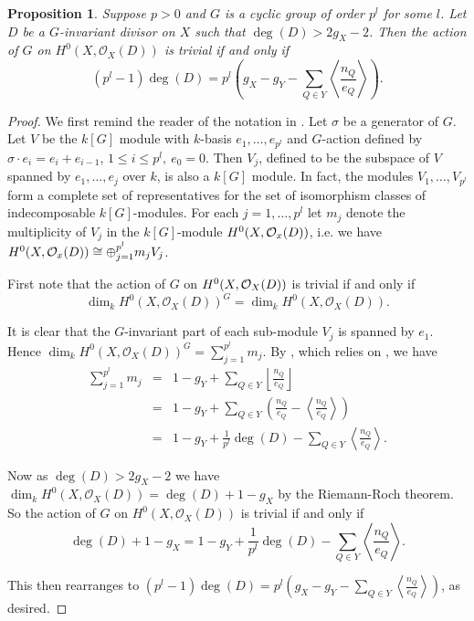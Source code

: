 \documentclass[11pt]{article} %
\newtheorem{prop}{Proposition}
\theoremstyle{remark}\newtheorem*{rem}{Remark}
\newcommand{\cO}{{\cal O}}
\begin{document}
  \begin{prop}\label{nakaj}
    Suppose $p>0$ and $G$ is a cyclic group of order $p^l$ for some $l$.
    Let $D$ be a $G$-invariant divisor on $X$ such that $\deg(D)>2g_X-2$.
    Then the action of $G$ on $H^0(X,\mathscr{O}_X(D))$ is trivial if and only if
      \[ 
	(p^l-1)\deg(D)=p^l\left(g_X-g_Y-\sum_{Q\in Y}\left\langle \frac{n_Q}{e_Q} \right\rangle\right).
      \]
  \end{prop}
  \begin{proof}
We first remind the reader of the notation in \cite{kako}.
Let $\sigma$ be a generator of $G$.
Let $V$ be the $k[G]$ module with $k$-basis $e_1,\ldots ,e_{p^l}$ and $G$-action defined by $\sigma\cdot e_i=e_i+e_{i-1}$, $1\leq i \leq p^l,\ e_0=0$.
Then $V_j$, defined to be the subspace of $V$ spanned by $e_1,\ldots ,e_j$ over $k$, is also a $k[G]$ module.
In fact, the modules $V_1,\ldots ,V_{p^l}$ form a complete set of representatives for the set of isomorphism classes of indecomposable $k[G]$-modules. For each $j=1,\ldots,p^l$ let $m_j$ denote the multiplicity of $V_j$ in the $k[G]$-module $H^0(X,\cO_x(D))$, i.e. we have $H^0(X,\cO_x(D))\cong \oplus_{j=1}^{p^l}m_jV_j$.



    First note that the action of $G$ on $H^0(X,\cO_X(D))$ is trivial if and only if
      \begin{equation}\label{triva}
	\dim_k H^0(X,\mathscr{O}_X(D))^G =\dim_k H^0(X,\mathscr{O}_X(D)).
      \end{equation}
	
    It is clear that the $G$-invariant part of each sub-module $V_j$ is spanned by $e_1$. 
    Hence $\dim_kH^0(X,\mathscr{O}_X(D))^G = \sum_{j=1}^{p^l} m_j$.
    By \cite[Theorem 2.1]{quaddiffequi}, which relies on \cite{Bo}, we have
      \begin{eqnarray*}
	\sum_{j=1}^{p^l} m_j & = & 1- g_Y +\sum_{Q\in Y} \left\lfloor \frac{n_Q}{e_Q}\right\rfloor\\
	& = & 1- g_Y + \sum_{Q\in Y} \left( \frac{n_Q}{e_Q} - \left\langle \frac{n_Q}{e_Q}\right\rangle \right) \\
  	& = & 1 - g_Y + \frac{1}{p^l}\deg(D) - \sum_{Q\in Y} \left\langle \frac{n_Q}{e_Q} \right\rangle.
      \end{eqnarray*}

    Now as $\deg(D)>2g_X-2$ we have $\dim_kH^0(X,\mathscr{O}_X(D)) =\deg(D)+1-g_X$ by the Riemann-Roch theorem. 
    So the action of $G$ on $H^0(X,\mathscr{O}_X(D))$ is trivial if and only if
      \begin{equation*}
	\deg(D)+1-g_X  = 1 - g_Y + \frac{1}{p^l}\deg(D) - \sum_{Q\in Y}\left\langle \frac{n_Q}{e_Q} \right\rangle. \label{hi}
      \end{equation*}

    This then rearranges to $(p^l-1)\deg(D)=p^l\left(g_X-g_Y-\sum_{Q\in Y}\left\langle \frac{n_Q}{e_Q} \right\rangle\right)$, as desired.
    \end{proof}
\end{document}
